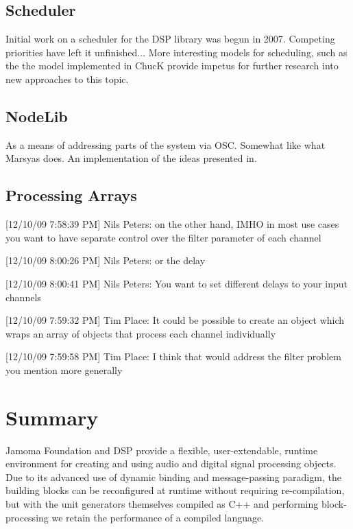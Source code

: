 \documentclass[twoside,10pt]{article}
\begin{document}
\subsection{Scheduler}

Initial work on a scheduler for the DSP library was begun in 2007.  Competing priorities have left it unfinished...  More interesting models for scheduling, such as the the model implemented in ChucK provide impetus for further research into new approaches to this topic.



\subsection{NodeLib}

As a means of addressing parts of the system via OSC.  Somewhat like what Marsyas does.  An implementation of the ideas presented in\cite{Place:2008osc}.


\subsection{Processing Arrays}

[12/10/09 7:58:39 PM] Nils Peters: on the other hand, IMHO in most use cases you want to have separate control over the filter parameter of each channel

[12/10/09 8:00:26 PM] Nils Peters: or the delay

[12/10/09 8:00:41 PM] Nils Peters: You want to set different delays to your input channels

[12/10/09 7:59:32 PM] Tim Place: It could be possible to create an object which wraps an array of objects that process each channel individually

[12/10/09 7:59:58 PM] Tim Place: I think that would address the filter problem you mention more generally



\section{Summary} %

Jamoma Foundation and DSP provide a flexible, user-extendable, runtime environment for creating and using audio and digital signal processing objects.  Due to its advanced use of dynamic binding and message-passing paradigm, the building blocks can be reconfigured at runtime without requiring re-compilation, but with the unit generators themselves compiled as C++ and performing block-processing we retain the performance of a compiled language.
\end{document}
